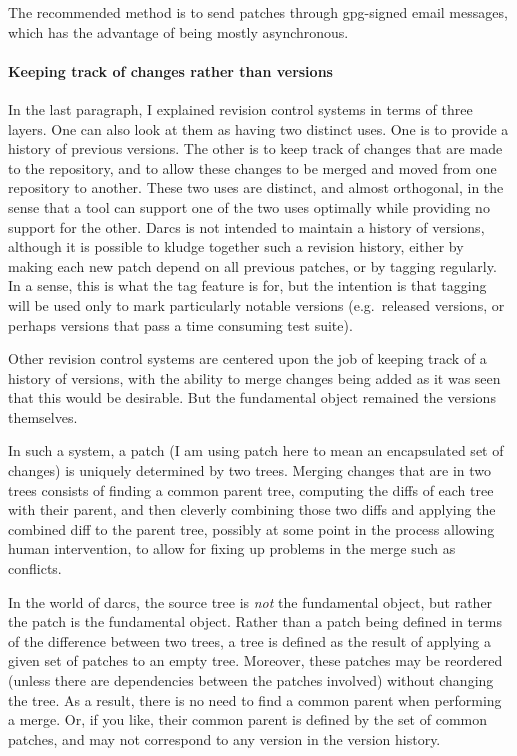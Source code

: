 \documentclass{book}
\begin{document}
The recommended method is to send patches through gpg-signed email
messages, which has the advantage of being mostly asynchronous.

\paragraph{Keeping track of changes rather than versions}

In the last paragraph, I explained revision control systems in terms of
three layers.  One can also look at them as having two distinct uses.  One
is to provide a history of previous versions.  The other is to keep track
of changes that are made to the repository, and to allow these changes to
be merged and moved from one repository to another.  These two uses are
distinct, and almost orthogonal, in the sense that a tool can support one
of the two uses optimally while providing no support for the other.  Darcs
is not intended to maintain a history of versions, although it is possible
to kludge together such a revision history, either by making each new patch
depend on all previous patches, or by tagging regularly.  In a sense, this
is what the tag feature is for, but the intention is that tagging will be
used only to mark particularly notable versions (e.g.\ released versions, or
perhaps versions that pass a time consuming test suite).

Other revision control systems are centered upon the job of keeping track
of a history of versions, with the ability to merge changes being added as
it was seen that this would be desirable.  But the fundamental object
remained the versions themselves.

In such a system, a patch (I am using patch here to mean an encapsulated
set of changes) is uniquely determined by two trees.  Merging changes that
are in two trees consists of finding a common parent tree, computing the
diffs of each tree with their parent, and then cleverly combining those two
diffs and applying the combined diff to the parent tree, possibly at some
point in the process allowing human intervention, to allow for fixing up
problems in the merge such as conflicts.

In the world of darcs, the source tree is \emph{not} the fundamental
object, but rather the patch is the fundamental object.  Rather than a
patch being defined in terms of the difference between two trees, a tree is
defined as the result of applying a given set of patches to an empty tree.
Moreover, these patches may be reordered (unless there are dependencies
between the patches involved) without changing the tree.  As a result,
there is no need to find a common parent when performing a merge.  Or, if
you like, their common parent is defined by the set of common patches, and
may not correspond to any version in the version history.
\end{document}
